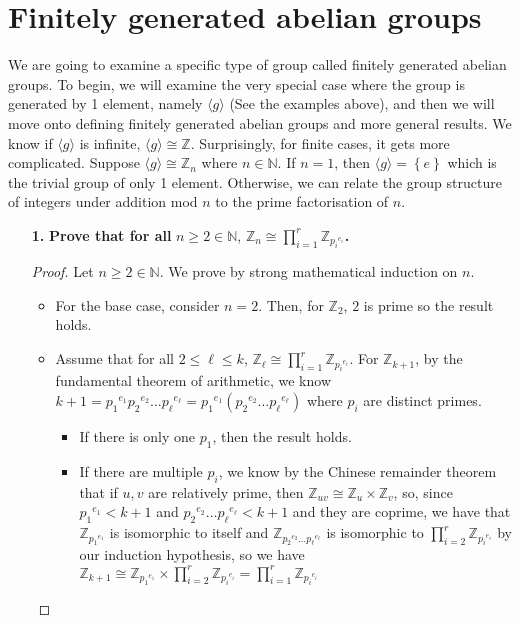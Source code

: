 \documentclass[letterpaper,12pt]{article}
\newcommand{\set}[1]{\left\{ #1 \right\}}
\begin{document}
\section{Finitely generated abelian groups}
We are going to examine a specific type of group called finitely generated abelian groups. To begin, we will examine the very special case where the group is generated by 1 element, namely $\langle g\rangle$ (See the examples above), and then we will move onto defining finitely generated abelian groups and more general results. We know if $\langle g \rangle$ is infinite, $\langle g \rangle \cong \mathbb{Z}$. Surprisingly, for finite cases, it gets more complicated. Suppose $\langle g \rangle \cong \mathbb{Z}_n$ where $n \in \mathbb{N}$. If $n = 1$, then $\langle g \rangle = \set{e}$ which is the trivial group of only 1 element. Otherwise, we can relate the group structure of integers under addition mod $n$ to the prime factorisation of $n$. \begin{enumerate}
    \item[\textbf{1.}] \textbf{Prove that for all} $n \geq 2\in \mathbb{N}$, $\mathbb{Z}_n \cong \prod_{i=1}^r \mathbb{Z}_{{p_i}^{e_i}}$\textbf{.} 
        \begin{proof}
    Let $n \geq 2 \in \mathbb{N}$. We prove by strong mathematical induction on $n$. \begin{itemize}
        \item For the base case, consider $n = 2$. Then, for $\mathbb{Z}_2$, $2$ is prime so the result holds.
        \item Assume that for all $2 \leq \ell \leq k$,  $\mathbb{Z}_\ell \cong \prod_{i=1}^r \mathbb{Z}_{{p_i}^{e_i}}$. For $\mathbb{Z}_{k+1}$, by the fundamental theorem of arithmetic, we know $k+1 = {p_1}^{e_1}{p_2}^{e_2}\ldots {p_\ell}^{e_\ell} = {p_1}^{e_1}({p_2}^{e_2}\ldots {p_\ell}^{e_\ell})$ where $p_i$ are distinct primes. \begin{itemize} \item If there is only one $p_1$, then the result holds.
        \item If there are multiple $p_i$, we know by the Chinese remainder theorem that if $u,v$ are relatively prime, then $\mathbb{Z}_{uv} \cong \mathbb{Z}_u \times \mathbb{Z}_v$, so, since ${p_1}^{e_1} < k+1$ and ${p_2}^{e_2}\ldots {p_\ell}^{e_\ell} < k+1$ and they are coprime, we have that $\mathbb{Z}_{{p_1}^{e_1}}$ is isomorphic to itself and $\mathbb{Z}_{{p_2}^{e_2}\ldots {p_\ell}^{e_\ell}}$ is isomorphic to $\prod_{i=2}^r \mathbb{Z}_{{p_i}^{e_i}}$ by our induction hypothesis, so we have $\mathbb{Z}_{k+1} \cong \mathbb{Z}_{{p_1}^{e_1}} \times \prod_{i=2}^r \mathbb{Z}_{{p_i}^{e_i}} = \prod_{i=1}^r \mathbb{Z}_{{p_i}^{e_i}}$ 
        \end{itemize}
    \end{itemize}
\end{proof}
\end{enumerate}
\end{document}
